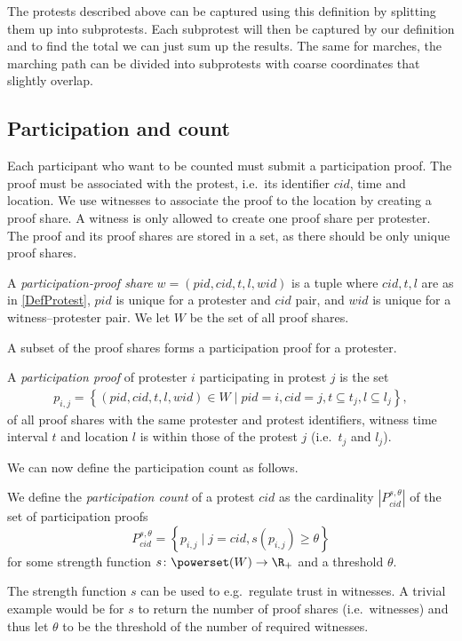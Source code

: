 The protests described above can be captured using this definition by splitting 
them up into subprotests.
Each subprotest will then be captured by our definition and to find the total 
we can just sum up the results.
The same for marches, the marching path can be divided into subprotests with 
coarse coordinates that slightly overlap.

\subsection{Participation and count}

Each participant who want to be counted must submit a participation proof.
The proof must be associated with the protest, i.e.\ its identifier \(cid\), 
time and location.
We use witnesses to associate the proof to the location by creating a proof 
share.
A witness is only allowed to create one proof share per protester.
The proof and its proof shares are stored in a set, as there should be only 
unique proof shares.

\begin{definition}
  A \emph{participation-proof share} \(w = (pid, cid, t, l, wid)\) is a tuple 
  where
  \(cid, t, l\) are as in \cref{DefProtest},
  \(pid\) is unique for a protester and \(cid\) pair, and
  \(wid\) is unique for a witness--protester pair.
  We let \(W\) be the set of all proof shares.
\end{definition}

A subset of the proof shares forms a participation proof for a protester.

\begin{definition}
  A \emph{participation proof} of protester \(i\) participating in protest \(j\) 
  is the set
  \begin{align}
    \nonumber
    p_{i, j} =
    \left\{ (pid, cid, t, l, wid)\in W \mid
    pid = i, cid = j,
    t \subseteq t_j, l\subseteq l_j \right\},
  \end{align}
  of all proof shares with the same protester and protest identifiers, witness 
  time interval \(t\) and location \(l\) is within those of the protest \(j\) 
  (i.e.\ \(t_j\) and \(l_j\)).
\end{definition}

We can now define the participation count as follows.
\begin{definition}
  We define the \emph{participation count} of a protest \(cid\) as the 
  cardinality \(|P_{cid}^{s,\theta}|\) of the set of participation proofs \[
    P_{cid}^{s,\theta} = \left\{ p_{i,j} \mid
      j = cid, s(p_{i,j})\geq \theta \right\}
  \] for some strength function \(s\colon \powerset(W)\to \R_+\) and a threshold 
  \(\theta\).
\end{definition}
The strength function \(s\) can be used to e.g.\ regulate trust in witnesses.
A trivial example would be for \(s\) to return the number of proof shares (i.e.\ 
witnesses) and thus let \(\theta\) to be the threshold of the number of required 
witnesses.
